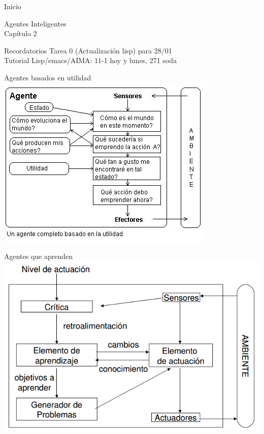 \documentclass{beamer}
\theoremstyle{definition}
\theoremstyle{theorem}
\theoremstyle{remark}
\begin{document}
\renewcommand{\tablename}{Table}
\renewcommand{\figurename}{\scriptsize Figure}

\begin{frame}{Inicio}
\begin{center}
    Agentes Inteligentes \\
    Capítulo 2
\end{center}
\end{frame}

\begin{frame}{Recordatorios}
Tarea 0 (Actualización lisp) para 28/01 \\
Tutorial Lisp/emacs/AIMA: 11-1 hoy y lunes, 271 soda

\end{frame}

\begin{frame}{Agentes basados en utilidad}
  \includegraphics[width=\textwidth,height=\textheight,keepaspectratio]{25_utilidad.jpg} 
\end{frame}

\begin{frame}{Agentes que aprenden}
  \includegraphics[width=\textwidth,height=\textheight,keepaspectratio]{26_queaprende.png}
\end{frame}
\end{document}
